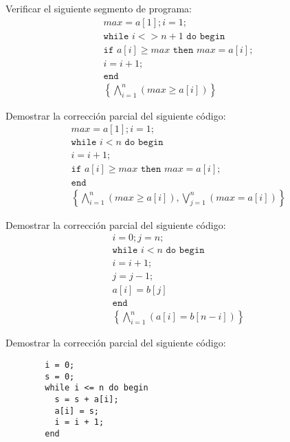 \begin{ejercicio}\label{ej_rel1_44}
    Verificar el siguiente segmento de programa:
    \begin{gather*}
        max = a[1]; i = 1; \\
        \texttt{while\ } i <> n+1 \texttt{\ do\ begin} \\
        \texttt{if\ } a[i] \geq max \texttt{\ then\ } max = a[i];\\
        i=i+1; \\
        \texttt{end} \\
        \left\{\bigwedge_{i=1}^n (max \geq a[i])\right\}
    \end{gather*}
\end{ejercicio}

\begin{ejercicio}
    Demostrar la corrección parcial del siguiente código:
    \begin{gather*}
        max = a[1]; i = 1; \\
        \texttt{while\ } i < n \texttt{\ do\ begin} \\
        i = i +1; \\
        \texttt{if\ } a[i] \geq max \texttt{\ then\ } max = a[i]; \\
        \texttt{end} \\
        \left\{\bigwedge_{i=1}^n (max \geq a[i]), \bigvee_{j=1}^n (max = a[i]) \right\}
    \end{gather*}
\end{ejercicio}

\begin{ejercicio}
    Demostrar la corrección parcial del siguiente código:
    \begin{gather*}
        i = 0; j= n; \\
        \texttt{while\ } i < n \texttt{\ do\ begin} \\
        i = i + 1; \\
        j = j - 1; \\
        a[i] = b[j] \\
        \texttt{end} \\
        \left\{\bigwedge_{i=1}^n(a[i] = b[n-i])\right\}
    \end{gather*}
\end{ejercicio}

\begin{ejercicio}
    Demostrar la corrección parcial del siguiente código:
    \begin{verbatim}
        i = 0;
        s = 0;
        while i <= n do begin
          s = s + a[i];
          a[i] = s;
          i = i + 1;
        end
    \end{verbatim}
\end{ejercicio}

